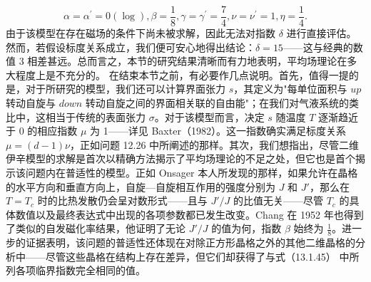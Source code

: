 \begin{equation}\tag{13.1.115}\label{eq:13.1.115}
\alpha = \alpha ^{\prime} = 0 ( \log ) ,  \beta = \frac { 1 } { 8 } ,  \gamma = \gamma ^{\prime} = \frac { 7 } { 4 } ,  \nu = \nu ^{\prime} = 1 ,  \eta = \frac { 1 } { 4 } .
\end{equation}
由于该模型在存在磁场的条件下尚未被求解，因此无法对指数 \(\delta\) 进行直接评估。然而，若假设标度关系成立，我们便可安心地得出结论：\(\delta = 15\)——这与经典的数值 3 相差甚远。总而言之，本节的研究结果清晰而有力地表明，平均场理论在多大程度上是不充分的。
在结束本节之前，有必要作几点说明。首先，值得一提的是，对于所研究的模型，我们还可以计算界面张力 \(s\)，其定义为"每单位面积与 \(up\) 转动自旋与 \(down\) 转动自旋之间的界面相关联的自由能"；在我们对气液系统的类比中，这相当于传统的表面张力 \(\sigma\)。对于该模型而言，决定 \(s\) 随温度 \(T\) 逐渐趋近于 0 的相应指数 \(\mu\) 为 1——详见 Baxter（1982）。这一指数确实满足标度关系 \(\mu = (d-1)\nu\)，正如问题 12.26 中所阐述的那样。其次，我们想指出，尽管二维伊辛模型的求解是首次以精确方法揭示了平均场理论的不足之处，但它也是首个揭示该问题内在普适性的模型。正如 Onsager 本人所发现的那样，如果允许在晶格的水平方向和垂直方向上，自旋---自旋相互作用的强度分别为 \(J\) 和 \(J'\)，那么在 \(T = T_c\) 时的比热发散仍会呈对数形式——且与 \(J'/J\) 的比值无关——尽管 \(T_c\) 的具体数值以及最终表达式中出现的各项参数都已发生改变。Chang 在 1952 年也得到了类似的自发磁化率结果，他证明了无论 \(J'/J\) 的值为何，指数 \(\beta\) 始终为 \(\frac{1}{8}\)。进一步的证据表明，该问题的普适性还体现在对除正方形晶格之外的其他二维晶格的分析中——尽管这些晶格在结构上存在差异，但它们却获得了与式（13.1.45） 中所列各项临界指数完全相同的值。
